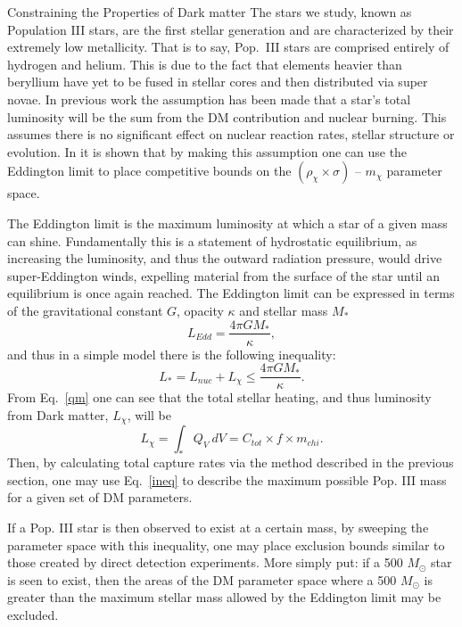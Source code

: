 \documentclass[a4paper,11pt]{article}
\begin{document}
\begin{section}{Constraining the Properties of Dark matter}
    The stars we study, known as Population III stars, are the first stellar generation and are characterized by their extremely low metallicity.
    That is to say, Pop.~III stars are comprised entirely of hydrogen and helium.
    This is due to the fact that elements heavier than beryllium have yet to be fused in stellar cores and then distributed via super novae. 
    In previous work the assumption has been made that a star's total luminosity will be the sum from the DM contribution and nuclear burning. 
    This assumes there is no significant effect on nuclear reaction rates, stellar structure or evolution.
    In \cite{Ilie:2020popiii} it is shown that by making this assumption one can use the Eddington limit to place competitive bounds on the $(\rho_\chi \times \sigma)$ \--- $m_\chi$ parameter space.

    The Eddington limit is the maximum luminosity at which a star of a given mass can shine.
    Fundamentally this is a statement of hydrostatic equilibrium, as increasing the luminosity, and thus the outward radiation pressure, would drive super-Eddington winds, expelling material from the surface of the star until an equilibrium is once again reached.
    The Eddington limit can be expressed in terms of the gravitational constant $G$, opacity $\kappa$ and stellar mass $M_*$
    \begin{equation}
        L_{Edd} = \frac{4\pi G M_*}{\kappa},
        \label{edd}
    \end{equation}
    and thus in a simple model there is the following inequality:
    \begin{equation}
        L_{*} = L_{nuc} + L_\chi \leq \frac{4\pi G M_*}{\kappa}. 
        \label{ineq}
    \end{equation}
    From Eq.~\ref{qm} one can see that the total stellar heating, and thus luminosity from Dark matter, $L_\chi$, will be
    \begin{equation}
    L_\chi = \int_{*} Q_{V} ~ dV = C_{tot} \times f \times m_{chi}.
    \end{equation}
    Then, by calculating total capture rates via the method described in the previous section, one may use Eq.~\ref{ineq} to describe the maximum possible Pop. III mass for a given set of DM parameters. 

    If a Pop. III star is then observed to exist at a certain mass, by sweeping the parameter space with this inequality, one may place exclusion bounds similar to those created by direct detection experiments.
    More simply put: if a 500 $M_\odot$ star is seen to exist, then the areas of the DM parameter space where a 500 $M_\odot$ is greater than the maximum stellar mass allowed by the Eddington limit may be excluded.


\end{section}
\end{document}

